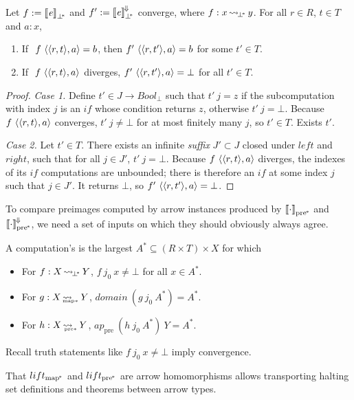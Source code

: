 \documentclass[preprint]{sigplanconf}
\newcommand{\arrow}{\rightsquigarrow}
\newcommand{\conv}{^{\mspace{-2mu}\Downarrow\mspace{-2mu}}}
\newcommand{\meaningofconv}[1]{\left\llbracket{#1}\right\rrbracket\conv}
\newcommand{\arrowlift}{\ensuremath{lift}}
\newcommand{\pre}{_\mathrm{pre}}
\newcommand{\pbot}{{\bot^{\mspace{-4mu}*}}}
\DeclareMathOperator{\pbotto}{\arrow_{\mspace{-3mu}\pbot}}
\newcommand{\pmap}{_\mathrm{map^{\mspace{-2mu}*}}}
\DeclareMathOperator{\pmapto}{\arrow_{\mspace{-22mu}_{\mathrm{map*}}}}
\newcommand{\liftpmap}{\arrowlift\pmap}
\newcommand{\ppre}{_\mathrm{pre^{\mspace{-2mu}*}}}
\DeclareMathOperator{\ppreto}{\arrow_{\mspace{-19mu}_{\mathrm{pre*}}}}
\newcommand{\liftppre}{\arrowlift\ppre}
\begin{document}
\begin{theorem}
Let $f := \meaningof{\mathit{e}}_\pbot$ and $f' := \meaningofconv{\mathit{e}}_\pbot$ converge, where $f : x \pbotto y$.
For all $r \in R$, $t \in T$ and $a : x$,
\begin{enumerate}
	\item If $~f~\langle{\langle{r,t}\rangle,a}\rangle = b$, then $f'~\langle{\langle{r,t'}\rangle,a}\rangle = b$ for some $t' \in T$.
	\item If $~f~\langle{\langle{r,t}\rangle,a}\rangle$ diverges, $f'~\langle{\langle{r,t'}\rangle,a}\rangle = \bot$ for all $t' \in T$.
\end{enumerate}
\end{theorem}
\begin{proof}
\emph{Case 1.}
Define $t' \in J \to Bool_\bot$ such that $t'~j = z$ if the subcomputation with index $j$ is an $if$ whose condition returns $z$, otherwise $t'~j = \bot$.
Because $f~\langle{\langle{r,t}\rangle,a}\rangle$ converges, $t'~j \neq \bot$ for at most finitely many $j$, so $t' \in T$.
Exists $t'$.

\emph{Case 2.}
Let $t' \in T$.
There exists an infinite \emph{suffix} $J' \subset J$ closed under $left$ and $right$, such that for all $j \in J'$, $t'~j = \bot$.
Because $f~\langle{\langle{r,t}\rangle,a}\rangle$ diverges, the indexes of its $if$ computations are unbounded; there is therefore an $if$ at some index $j$ such that $j \in J'$.
It returns $\bot$, so $f'~\langle{\langle{r,t'}\rangle,a}\rangle = \bot$.
\end{proof}

To compare preimages computed by arrow instances produced by $\meaningof{\cdot}\ppre$ and $\meaningofconv{\cdot}\ppre$, we need a set of inputs on which they should obviously always agree.

\begin{definition}
A computation's  is the largest $A^* \subseteq (R \times T) \times X$ for which
\begin{itemize}
	\item For $f : X \pbotto Y$, $f~j_0~x \neq \bot$ for all $x \in A^*$.
	\item For $g : X \pmapto Y$, $domain~(g~j_0~A^*) = A^*$.
	\item For $h : X \ppreto Y$, $ap\pre~(h~j_0~A^*)~Y = A^*$.
\end{itemize}
Recall truth statements like $f~j_0~x \neq \bot$ imply convergence.
\end{definition}

That $\liftpmap$ and $\liftppre$ are arrow homomorphisms allows transporting halting set definitions and theorems between arrow types.
\end{document}

